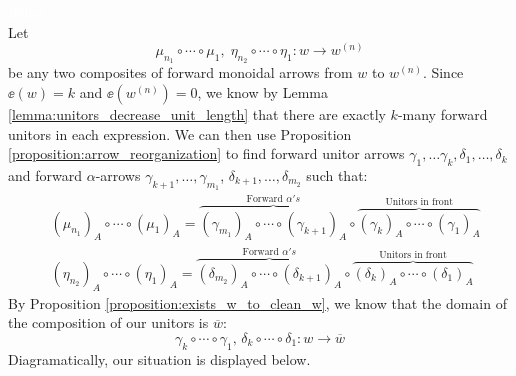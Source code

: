 \begin{varprf}
    \textcolor{white}{Hello!}
    \\
    Let 
    \[
        \mu_{n_1} \circ \cdots \circ \mu_1, \; \eta_{n_2} \circ \cdots \circ \eta_1: w \to w^{(n)}
    \]
    be any two composites of forward monoidal arrows from $w$ to $w^{(n)}$.
    Since $\ee(w) = k$ and $\ee( w^{(n)}) = 0$, we know 
    by Lemma \ref{lemma:unitors_decrease_unit_length} that
    there are exactly $k$-many forward unitors in each expression. 
    We can then use Proposition 
    \ref{proposition:arrow_reorganization} to find forward unitor arrows  
    $\gamma_1, \dots \gamma_k, \delta_1, \dots, \delta_k$ and forward $\alpha$-arrows 
    $\gamma_{k+1}, \dots, \gamma_{m_1}$, $\delta_{k+1}, \dots, \delta_{m_2}$ such that:
    \begin{align*}
        &(\mu_{n_1})_A \circ \cdots \circ (\mu_1)_A = \overbrace{(\gamma_{m_1})_A \circ \cdots \circ (\gamma_{k+1})_A}^{\text{Forward } \alpha's}\circ \overbrace{(\gamma_{k})_A\circ \cdots \circ (\gamma_1)_A}^{\text{Unitors in front}}\\
        &(\eta_{n_2})_A \circ \cdots \circ (\eta_1)_A = \overbrace{(\delta_{m_2})_A \circ \cdots \circ (\delta_{k+1})_A}^{\text{Forward } \alpha's}\circ \overbrace{(\delta_{k})_A\circ \cdots \circ (\delta_1)_A}^{\text{Unitors in front}}
    \end{align*}
    By Proposition \ref{proposition:exists_w_to_clean_w}, 
    we know that the domain of the composition of our unitors is $\overline{w}$:
    \[
        \gamma_{k} \circ \cdots \circ \gamma_1,\,
        \delta_{k} \circ \cdots \circ \delta_1: w \to \overline{w}
    \]
    Diagramatically, our situation is displayed below.
    \begin{center}
\end{center}
\end{varprf}
